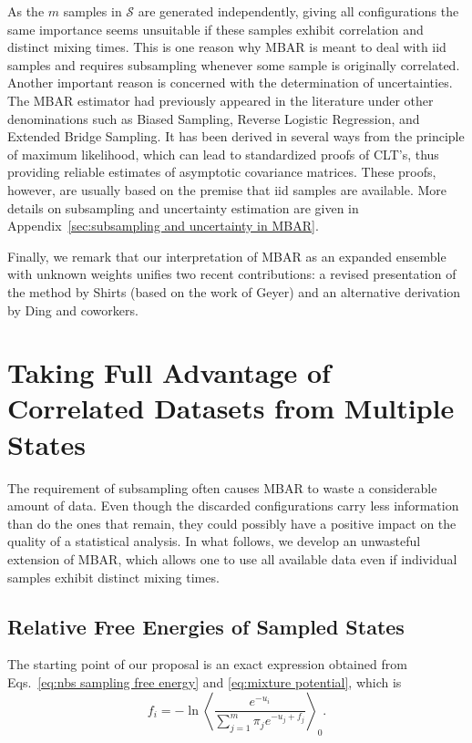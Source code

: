 \documentclass[aip,jcp,reprint,amsmath,amssymb]{revtex4-1}
\begin{document}
As the $m$ samples in $\mathcal S$ are generated independently, giving all configurations the same importance seems unsuitable if these samples exhibit correlation and distinct mixing times. This is one reason why MBAR is meant to deal with iid samples and requires subsampling whenever some sample is originally correlated.\cite{Shirts_2008} Another important reason is concerned with the determination of uncertainties. The MBAR estimator had previously appeared in the literature under other denominations such as Biased Sampling,\cite{Vardi_1985, *Gill_1988} Reverse Logistic Regression,\cite{Geyer_1994} and Extended Bridge Sampling.\cite{Meng_1996, Kong_2003, Tan_2004} It has been derived in several ways from the principle of maximum likelihood, which can lead to standardized proofs of CLT's, thus providing reliable estimates of asymptotic covariance matrices.\cite{Pawitan_2001, Greene_2012} These proofs, however, are usually based on the premise that iid samples are available. More details on subsampling and uncertainty estimation are given in Appendix~\ref{sec:subsampling and uncertainty in MBAR}.

Finally, we remark that our interpretation of MBAR as an expanded ensemble with unknown weights unifies two recent contributions: a revised presentation of the method by Shirts\cite{Shirts_2017} (based on the work of Geyer\cite{Geyer_1994}) and an alternative derivation by Ding and coworkers.\cite{Ding_2017}

\section{Taking Full Advantage of Correlated Datasets from Multiple States}

The requirement of subsampling often causes MBAR to waste a considerable amount of data. Even though the discarded configurations carry less information than do the ones that remain, they could possibly have a positive impact on the quality of a statistical analysis. In what follows, we develop an unwasteful extension of MBAR, which allows one to use all available data even if individual samples exhibit distinct mixing times.

\subsection{Relative Free Energies of Sampled States}

The starting point of our proposal is an exact expression obtained from Eqs.~\eqref{eq:nbs sampling free energy} and \eqref{eq:mixture potential}, which is
\begin{equation}
\label{eq:free energy exact}
f_i = -\ln \left\langle \frac{e^{-u_i}}{\sum_{j=1}^m \pi_j e^{-u_j + f_j}} \right\rangle_0.
\end{equation}
\end{document}
